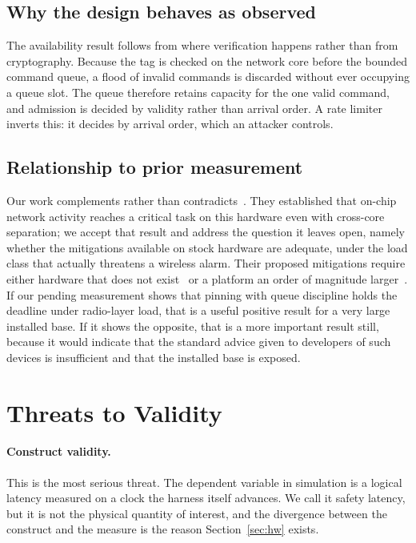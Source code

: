 \subsection{Why the design behaves as observed}

The availability result follows from where verification happens rather than from cryptography.
Because the tag is checked on the network core before the bounded command queue, a flood of
invalid commands is discarded without ever occupying a queue slot. The queue therefore retains
capacity for the one valid command, and admission is decided by validity rather than arrival
order. A rate limiter inverts this: it decides by arrival order, which an attacker controls.

\subsection{Relationship to prior measurement}

Our work complements rather than contradicts~\cite{behnke2020}. They established that on-chip
network activity reaches a critical task on this hardware even with cross-core separation; we
accept that result and address the question it leaves open, namely whether the mitigations
available on stock hardware are adequate, under the load class that actually threatens a wireless
alarm. Their proposed mitigations require either hardware that does not
exist~\cite{behnke2022} or a platform an order of magnitude larger~\cite{behnke2023}. If our
pending measurement shows that pinning with queue discipline holds the deadline under radio-layer
load, that is a useful positive result for a very large installed base. If it shows the opposite,
that is a more important result still, because it would indicate that the standard advice given
to developers of such devices is insufficient and that the installed base is exposed.

\section{Threats to Validity}\label{sec:threats}

\paragraph{Construct validity.} This is the most serious threat. The dependent variable in
simulation is a logical latency measured on a clock the harness itself advances. We call it
safety latency, but it is not the physical quantity of interest, and the divergence between the
construct and the measure is the reason Section~\ref{sec:hw} exists.

